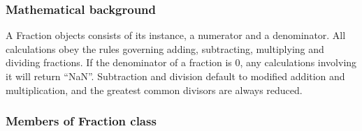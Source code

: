 \documentclass[letterpaper,10pt,english]{sphinxhowto}
\begin{document}
\subsubsection{Mathematical background}
\label{\detokenize{fraction:mathematical-background}}
A Fraction objects consists of its instance, a numerator and a denominator.
All calculations obey the rules governing adding, subtracting, multiplying and dividing fractions.
If the denominator of a fraction is 0, any calculations involving it will return “NaN”.
Subtraction and division default to modified addition and multiplication, and the greatest common divisors are always reduced.


\subsubsection{Members of Fraction class}
\label{\detokenize{fraction:members-of-fraction-class}}\label{\detokenize{fraction:fraction-class}}\label{\detokenize{fraction:module-fraction}}
\end{document}
